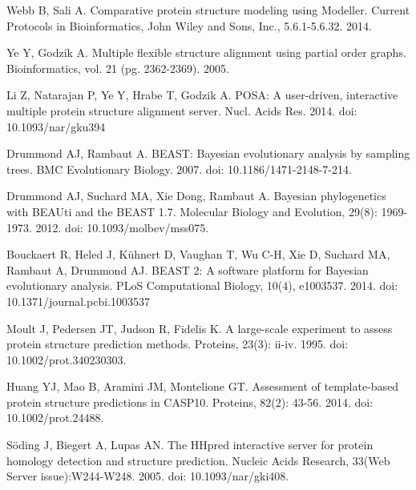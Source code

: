 \documentclass[10pt,letterpaper]{article}
\begin{document}
\begin{thebibliography}{10}
Webb B, Sali A.
\newblock Comparative protein structure modeling using Modeller.
\newblock Current Protocols in Bioinformatics, John Wiley and Sons, Inc., 5.6.1-5.6.32. 2014.

Ye Y, Godzik A.
\newblock Multiple flexible structure alignment using partial order graphs.
\newblock Bioinformatics, vol. 21 (pg. 2362-2369). 2005.

Li Z, Natarajan P, Ye Y, Hrabe T, Godzik A.
\newblock POSA: A user-driven, interactive multiple protein structure alignment server.
\newblock Nucl. Acids Res. 2014. doi: 10.1093/nar/gku394

Drummond AJ, Rambaut A.
\newblock BEAST: Bayesian evolutionary analysis by sampling trees.
\newblock BMC Evolutionary Biology. 2007. doi: 10.1186/1471-2148-7-214.

Drummond AJ, Suchard MA, Xie Dong, Rambaut A.
\newblock Bayesian phylogenetics with BEAUti and the BEAST 1.7.
\newblock Molecular Biology and Evolution, 29(8): 1969-1973. 2012. doi: 10.1093/molbev/mss075.

Bouckaert R, Heled J, Kühnert D, Vaughan T, Wu C-H, Xie D, Suchard MA, Rambaut A, Drummond AJ.
\newblock BEAST 2: A software platform for Bayesian evolutionary analysis.
\newblock PLoS Computational Biology, 10(4), e1003537. 2014. doi: 10.1371/journal.pcbi.1003537

Moult J, Pedersen JT, Judson R, Fidelis K.
\newblock A large-scale experiment to assess protein structure prediction methods.
\newblock Proteins, 23(3): ii-iv. 1995. doi: 10.1002/prot.340230303.


Huang YJ, Mao B, Aramini JM, Montelione GT.
\newblock Assessment of template-based protein structure predictions in CASP10.
\newblock Proteins, 82(2): 43-56. 2014. doi: 10.1002/prot.24488.

Söding J, Biegert A, Lupas AN.
\newblock The HHpred interactive server for protein homology detection and structure prediction. 
\newblock Nucleic Acids Research, 33(Web Server issue):W244-W248. 2005. doi: 10.1093/nar/gki408.



\end{thebibliography}
\end{document}
